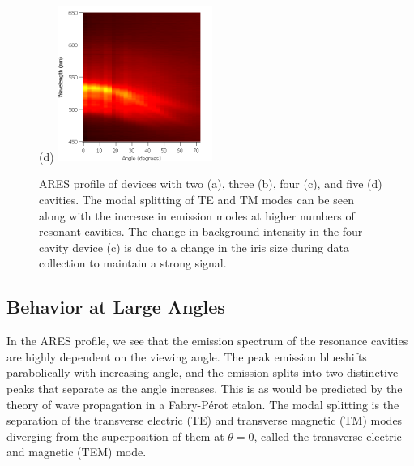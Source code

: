 \documentclass{report}
\begin{document}
\begin{figure}[h!]
            (d)
            \includegraphics[width=0.45\textwidth]{images/n5_heatmap.png}
            \caption{ARES profile of devices with two (a), three (b), four (c), and five (d) cavities. The modal splitting of TE and TM modes can be seen along with the increase in emission modes at higher numbers of resonant cavities. The change in background intensity in the four cavity device (c) is due to a change in the iris size during data collection to maintain a strong signal.}
            \label{fig:heatmaps}
		\end{figure}
    
        \subsection{Behavior at Large Angles} \label{largeAngle}
		In the ARES profile, we see that the emission spectrum of the resonance cavities are highly dependent on the viewing angle. The peak emission blueshifts parabolically with increasing angle, and the emission splits into two distinctive peaks that separate as the angle increases. This is as would be predicted by the theory of wave propagation in a Fabry-P\'erot etalon.\cite{Lim2011} The modal splitting is the separation of the transverse electric (TE) and transverse magnetic (TM) modes diverging from the superposition of them at $\theta=0$, called the transverse electric and magnetic (TEM) mode. %

    
\end{document}

